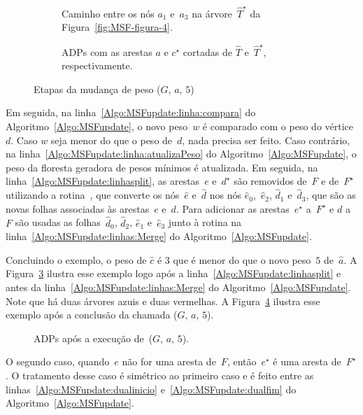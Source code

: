 \begin{figure}[!h]
\begin{subfigure}{.3\textwidth}
\scalebox{.8}{

}
\caption{Caminho entre os nós $a_1$ e~$a_3$ na árvore~$\hat T^\star$ da Figura~\ref{fig:MSF-figura-4}.}
\label{fig:MSF-figura-5}
\end{subfigure}
\hspace{1cm}
\begin{subfigure}{.6\textwidth}
\scalebox{.8}{

}
\caption{ADPs com as arestas $a$ e $c^\star$ cortadas de $\hat T$ e~$\hat T^\star$, respectivamente.}
\label{fig:MSF-figura-6}
\end{subfigure}
\caption{Etapas da mudança de peso \MSFupdate($G$, $a$, $5$)}
\end{figure}

Em seguida, na linha~\ref{Algo:MSFupdate:linha:compara} do Algoritmo~\ref{Algo:MSFupdate}, o novo peso~$w$ é comparado com o peso do vértice~$d$.
Caso $w$ seja menor do que o peso de~$d$, nada precisa ser feito.
Caso contrário, na linha~\ref{Algo:MSFupdate:linha:atualizaPeso} do Algoritmo~\ref{Algo:MSFupdate}, o peso da floresta geradora de pesos mínimos é atualizada.
Em seguida, na linha~\ref{Algo:MSFupdate:linhasplit}, as arestas~$e$ e~$d^\star$ são removidos de~$F$ e de~$F^\star$ utilizando a rotina~\LCOSplit{}, que converte os nós~$\hat e$ e~$\hat d$ nos nós $\hat e_0$,~$\hat e_2$, $\hat d_1$ e~$\hat d_3$, que são as novas folhas associadas às arestas~$e$ e~$d$.
Para adicionar as arestas~$e^\star$ a~$F^\star$ e $d$ a~$F$ são usadas as folhas~$\hat d_0$, $\hat d_2$, $\hat e_1$ e~$\hat e_3$ junto à rotina \LCOMerge{} na linha~\ref{Algo:MSFupdate:linhas:Merge} do Algoritmo~\ref{Algo:MSFupdate}.

Concluindo o exemplo, o peso de $\hat c$ é $3$ que é menor do que o novo peso~$5$ de~$\hat a$.
A Figura~\ref{fig:MSF-figura-6} ilustra esse exemplo logo após a linha~\ref{Algo:MSFupdate:linhasplit} e antes da linha~\ref{Algo:MSFupdate:linhas:Merge} do Algoritmo~\ref{Algo:MSFupdate}.
Note que há duas árvores azuis e duas vermelhas.
A Figura~\ref{fig:MSF-figura-7} ilustra esse exemplo após a conclusão da chamada \MSFupdate($G$, $a$, $5$).

\begin{figure}[htb]
\scalebox{1}{
\centering

}
\caption{ADPs após a execução de~\MSFupdate($G$, $a$, $5$).}
\label{fig:MSF-figura-7}
\end{figure}

O segundo caso, quando~$e$ não for uma aresta de~$F$, então~$e^\star$ é uma aresta de~$F^\star$.
O tratamento desse caso é simétrico ao primeiro caso e é feito entre as linhas~\ref{Algo:MSFupdate:dualinicio} e~\ref{Algo:MSFupdate:dualfim} do Algoritmo~\ref{Algo:MSFupdate}.

